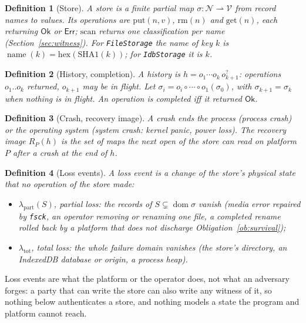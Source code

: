 \documentclass[journal]{IEEEtran}
\newtheorem{definition}{Definition}
\newcommand{\Nm}{\mathcal{N}}
\newcommand{\Vl}{\mathcal{V}}
\newcommand{\dom}{\operatorname{dom}}
\newcommand{\name}{\operatorname{name}}
\newcommand{\Ok}{\mathsf{Ok}}
\newcommand{\Err}{\mathsf{Err}}
\begin{document}
\begin{definition}[Store]\label{def:store}
A store is a finite partial map $\sigma:\Nm\rightharpoonup\Vl$ from record names to values.
Its operations are $\mathrm{put}(n,v)$, $\mathrm{rm}(n)$ and $\mathrm{get}(n)$, each
returning $\Ok$ or $\Err$; $\mathrm{scan}$ returns one classification per name
(Section~\ref{sec:witness}).  For \texttt{FileStorage} the name of key $k$ is
$\name(k)=\mathrm{hex}(\mathrm{SHA1}(k))$; for \texttt{IdbStorage} it is $k$.
\end{definition}

\begin{definition}[History, completion]\label{def:history}
A history is $h=o_1\cdots o_k\,o_{k+1}^{?}$: operations $o_1..o_k$ returned, $o_{k+1}$ may
be in flight.  Let $\sigma_i=o_i\circ\cdots\circ o_1(\sigma_0)$, with $\sigma_{k+1}=\sigma_k$
when nothing is in flight.  An operation is \emph{completed} iff it returned $\Ok$.
\end{definition}

\begin{definition}[Crash, recovery image]\label{def:crash}
A crash ends the process (\emph{process crash}) or the operating system
(\emph{system crash}: kernel panic, power loss).  The recovery image $R_P(h)$ is the set of
maps the next open of the store can read on platform $P$ after a crash at the end of $h$.
\end{definition}

\begin{definition}[Loss events]\label{def:loss}
A loss event is a change of the store's physical state that no operation of the store made:
\begin{itemize}[leftmargin=1.2em]
\item $\lambda_{\mathrm{part}}(S)$, \emph{partial loss}: the records of $S\subsetneq\dom\sigma$
vanish (media error repaired by \texttt{fsck}, an operator removing or renaming one file, a
completed rename rolled back by a platform that does not discharge
Obligation~\ref{ob:survival});
\item $\lambda_{\mathrm{tot}}$, \emph{total loss}: the whole failure domain vanishes (the
store's directory, an IndexedDB database or origin, a process heap).
\end{itemize}
\end{definition}

Loss events are what the platform or the operator does, not what an adversary forges: a
party that can write the store can also write any witness of it, so nothing below
authenticates a store, and nothing models a state the program and platform cannot reach.
\end{document}
